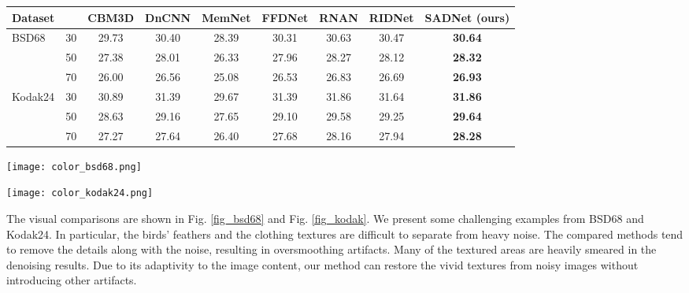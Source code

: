 \documentclass[runningheads]{llncs}
\begin{document}
\begin{table*}
\setlength{\tabcolsep}{2pt}
\begin{center}
\caption{Average PSNR(dB) results on synthetic \textbf{color} noisy images}
\label{table_color}
\begin{tabular}{lcccccccc}
\hline
Dataset &  & CBM3D & DnCNN & MemNet & FFDNet & RNAN & RIDNet & SADNet (ours) \\
\hline\hline
\multirow{2}{*}{BSD68} & 30 & 29.73 & 30.40 & 28.39 & 30.31 & 30.63 & 30.47 & \textbf{30.64}\\
~ & 50 & 27.38 & 28.01 & 26.33 & 27.96 & 28.27 & 28.12 & \textbf{28.32}\\
~ & 70 & 26.00 & 26.56 & 25.08 & 26.53 & 26.83 & 26.69 & \textbf{26.93}\\
\hline
\multirow{2}{*}{Kodak24} & 30 & 30.89 & 31.39 & 29.67 & 31.39 & 31.86 & 31.64 & \textbf{31.86}\\
~ & 50 & 28.63 & 29.16 & 27.65 & 29.10 & 29.58 & 29.25 & \textbf{29.64}\\
~ & 70 & 27.27 & 27.64 & 26.40 & 27.68 & 28.16 & 27.94 & \textbf{28.28}\\
\hline
\end{tabular}
\end{center}
\end{table*}

\begin{figure*}
\begin{center}
\texttt{[image: color\_bsd68.png]}
\end{center}
\setlength{\abovecaptionskip}{0.cm}
   \caption{Synthetic image denoising results on BSD68 with noise level .}
\label{fig_bsd68}
\end{figure*}

\begin{figure*}
\begin{center}
\texttt{[image: color\_kodak24.png]}
\end{center}
\setlength{\abovecaptionskip}{0.cm}
   \caption{Synthetic image denoising results on Kodak24 with noise level .}
\label{fig_kodak}
\end{figure*}

The visual comparisons are shown in Fig. \ref{fig_bsd68} and Fig. \ref{fig_kodak}. We present some challenging examples from BSD68 and Kodak24. In particular, the birds' feathers and the clothing textures are difficult to separate from heavy noise. The compared methods tend to remove the details along with the noise, resulting in oversmoothing artifacts. Many of the textured areas are heavily smeared in the denoising results. Due to its adaptivity to the image content, our method can restore the vivid textures from noisy images without introducing other artifacts.
\end{document}
